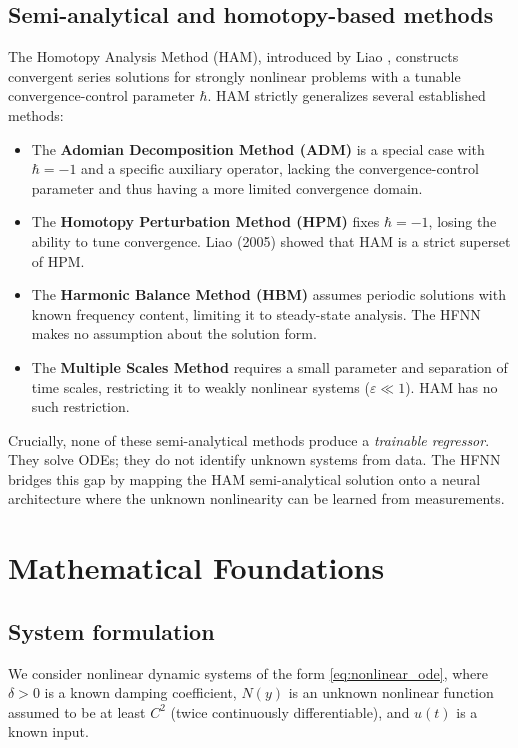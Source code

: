 \documentclass[preprint,12pt]{elsarticle}
\begin{document}
\subsection{Semi-analytical and homotopy-based methods}
\label{sec:semianalytical}
The Homotopy Analysis Method (HAM), introduced by Liao \cite{liao1992, liao2003, liao2012}, constructs convergent series solutions for strongly nonlinear problems with a tunable convergence-control parameter $\hbar$. HAM strictly generalizes several established methods:
\begin{itemize}
\item The \textbf{Adomian Decomposition Method (ADM)} is a special case with $\hbar = -1$ and a specific auxiliary operator, lacking the convergence-control parameter and thus having a more limited convergence domain.
\item The \textbf{Homotopy Perturbation Method (HPM)} \cite{he1999} fixes $\hbar = -1$, losing the ability to tune convergence. Liao (2005) showed that HAM is a strict superset of HPM.
\item The \textbf{Harmonic Balance Method (HBM)} assumes periodic solutions with known frequency content, limiting it to steady-state analysis. The HFNN makes no assumption about the solution form.
\item The \textbf{Multiple Scales Method} requires a small parameter and separation of time scales, restricting it to weakly nonlinear systems ($\varepsilon \ll 1$). HAM has no such restriction.
\end{itemize}
Crucially, none of these semi-analytical methods produce a \emph{trainable regressor}. They solve ODEs; they do not identify unknown systems from data. The HFNN bridges this gap by mapping the HAM semi-analytical solution onto a neural architecture where the unknown nonlinearity can be learned from measurements.


\section{Mathematical Foundations}
\label{sec:foundations}

\subsection{System formulation}
We consider nonlinear dynamic systems of the form \eqref{eq:nonlinear_ode}, where $\delta > 0$ is a known damping coefficient, $N(y)$ is an unknown nonlinear function assumed to be at least $C^2$ (twice continuously differentiable), and $u(t)$ is a known input.
\end{document}
